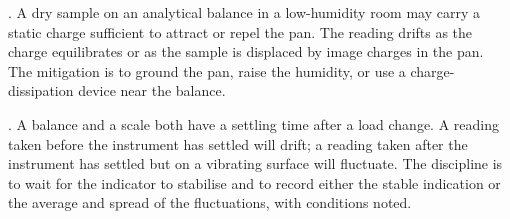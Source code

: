 . A dry sample on an analytical balance
in a low-humidity room may carry a static charge sufficient to
attract or repel the pan. The reading drifts as the charge equilibrates
or as the sample is displaced by image charges in the pan. The
mitigation is to ground the pan, raise the humidity, or use a
charge-dissipation device near the balance.

. A balance and a scale both have a
settling time after a load change. A reading taken before the
instrument has settled will drift; a reading taken after the
instrument has settled but on a vibrating surface will fluctuate. The
discipline is to wait for the indicator to stabilise and to record
either the stable indication or the average and spread of the
fluctuations, with conditions noted.

